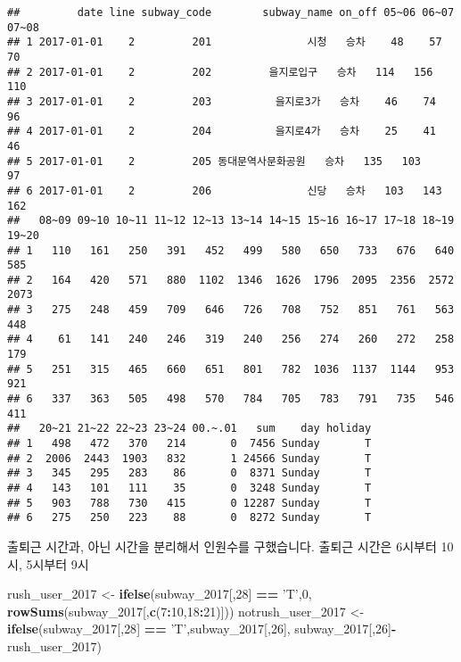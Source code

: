 \documentclass[]{article}
\newenvironment{Shaded}{\begin{snugshade}}{\end{snugshade}}
\newcommand{\KeywordTok}[1]{\textcolor[rgb]{0.13,0.29,0.53}{\textbf{#1}}}
\newcommand{\DecValTok}[1]{\textcolor[rgb]{0.00,0.00,0.81}{#1}}
\newcommand{\StringTok}[1]{\textcolor[rgb]{0.31,0.60,0.02}{#1}}
\newcommand{\OperatorTok}[1]{\textcolor[rgb]{0.81,0.36,0.00}{\textbf{#1}}}
\newcommand{\NormalTok}[1]{#1}
\begin{document}
\begin{verbatim}
##         date line subway_code        subway_name on_off 05~06 06~07 07~08
## 1 2017-01-01    2         201               시청   승차    48    57    70
## 2 2017-01-01    2         202         을지로입구   승차   114   156   110
## 3 2017-01-01    2         203          을지로3가   승차    46    74    96
## 4 2017-01-01    2         204          을지로4가   승차    25    41    46
## 5 2017-01-01    2         205 동대문역사문화공원   승차   135   103    97
## 6 2017-01-01    2         206               신당   승차   103   143   162
##   08~09 09~10 10~11 11~12 12~13 13~14 14~15 15~16 16~17 17~18 18~19 19~20
## 1   110   161   250   391   452   499   580   650   733   676   640   585
## 2   164   420   571   880  1102  1346  1626  1796  2095  2356  2572  2073
## 3   275   248   459   709   646   726   708   752   851   761   563   448
## 4    61   141   240   246   319   240   256   274   260   272   258   179
## 5   251   315   465   660   651   801   782  1036  1137  1144   953   921
## 6   337   363   505   498   570   784   705   783   791   735   546   411
##   20~21 21~22 22~23 23~24 00.~.01   sum    day holiday
## 1   498   472   370   214       0  7456 Sunday       T
## 2  2006  2443  1903   832       1 24566 Sunday       T
## 3   345   295   283    86       0  8371 Sunday       T
## 4   143   101   111    35       0  3248 Sunday       T
## 5   903   788   730   415       0 12287 Sunday       T
## 6   275   250   223    88       0  8272 Sunday       T
\end{verbatim}

출퇴근 시간과, 아닌 시간을 분리해서 인원수를 구했습니다. 출퇴근 시간은
6시부터 10시, 5시부터 9시

\begin{Shaded}
\begin{Highlighting}[]
\NormalTok{rush_user_}\DecValTok{2017}\NormalTok{ <-}\StringTok{ }\KeywordTok{ifelse}\NormalTok{(subway_}\DecValTok{2017}\NormalTok{[,}\DecValTok{28}\NormalTok{] }\OperatorTok{==}\StringTok{ 'T'}\NormalTok{,}\DecValTok{0}\NormalTok{, }\KeywordTok{rowSums}\NormalTok{(subway_}\DecValTok{2017}\NormalTok{[,}\KeywordTok{c}\NormalTok{(}\DecValTok{7}\OperatorTok{:}\DecValTok{10}\NormalTok{,}\DecValTok{18}\OperatorTok{:}\DecValTok{21}\NormalTok{)]))}
\NormalTok{notrush_user_}\DecValTok{2017}\NormalTok{ <-}\StringTok{ }\KeywordTok{ifelse}\NormalTok{(subway_}\DecValTok{2017}\NormalTok{[,}\DecValTok{28}\NormalTok{] }\OperatorTok{==}\StringTok{ 'T'}\NormalTok{,subway_}\DecValTok{2017}\NormalTok{[,}\DecValTok{26}\NormalTok{], subway_}\DecValTok{2017}\NormalTok{[,}\DecValTok{26}\NormalTok{]}\OperatorTok{-}\NormalTok{rush_user_}\DecValTok{2017}\NormalTok{)}
\end{Highlighting}
\end{Shaded}
\end{document}
